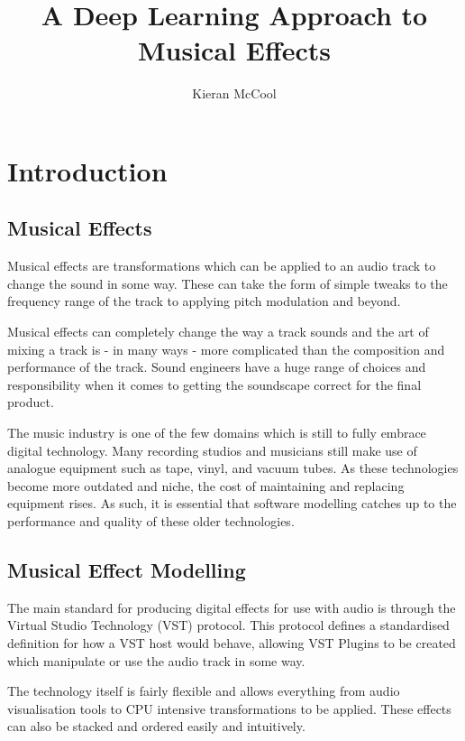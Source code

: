\documentclass{l4proj}
\title{A Deep Learning Approach to Musical Effects}
\author{Kieran McCool}
\begin{document}
\maketitle

\tableofcontents
\hypertarget{introduction}{%
\chapter{Introduction}\label{introduction}}

\hypertarget{musical-effects}{%
\section{Musical Effects}\label{musical-effects}}

Musical effects are transformations which can be applied to an audio
track to change the sound in some way. These can take the form of simple
tweaks to the frequency range of the track to applying pitch modulation
and beyond.

Musical effects can completely change the way a track sounds and the art
of mixing a track is - in many ways - more complicated than the
composition and performance of the track. Sound engineers have a huge
range of choices and responsibility when it comes to getting the
soundscape correct for the final product.

The music industry is one of the few domains which is still to fully
embrace digital technology. Many recording studios and musicians still
make use of analogue equipment such as tape, vinyl, and vacuum tubes. As
these technologies become more outdated and niche, the cost of
maintaining and replacing equipment rises. As such, it is essential that
software modelling catches up to the performance and quality of these
older technologies.

\hypertarget{musical-effect-modelling}{%
\section{Musical Effect Modelling}\label{musical-effect-modelling}}

The main standard for producing digital effects for use with audio is
through the Virtual Studio Technology (VST) protocol. This protocol
defines a standardised definition for how a VST host would behave,
allowing VST Plugins to be created which manipulate or use the audio
track in some way.

The technology itself is fairly flexible and allows everything from
audio visualisation tools to CPU intensive transformations to be
applied. These effects can also be stacked and ordered easily and
intuitively.
\end{document}

